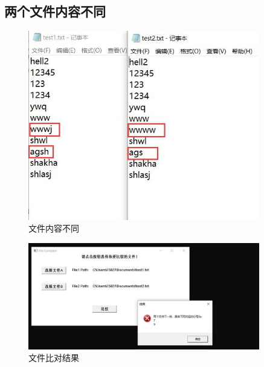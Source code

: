 \subsection{两个文件内容不同}
\begin{figure}[H]
    \centering
    \includegraphics[width= 0.9\textwidth]{assets/文件比对2}
    \caption{文件内容不同}
    \label{文件内容不同}
\end{figure}
\begin{figure}[H]
    \centering
    \includegraphics[width= 0.9\textwidth]{assets/文件对比1}
    \caption{文件比对结果}
    \label{文件比对结果2}
\end{figure}


